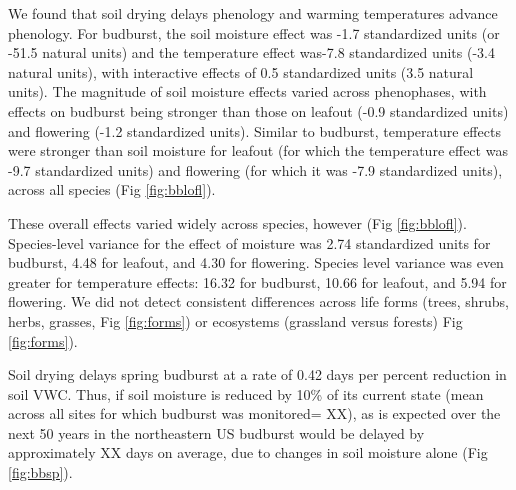 \documentclass{article}
\begin{document}
\par We found that soil drying delays phenology and warming temperatures advance phenology. For budburst, the soil moisture effect was -1.7 standardized units (or -51.5 natural units) and the temperature effect was-7.8 standardized units (-3.4 natural units), with interactive effects of 0.5 standardized units (3.5 natural units). The magnitude of soil moisture effects varied across phenophases, with effects on budburst being stronger than those on leafout (-0.9 standardized units) and flowering (-1.2 standardized units). Similar to budburst, temperature effects were stronger than soil moisture for leafout (for which the temperature effect was -9.7 standardized units) and flowering (for which it was -7.9 standardized units), across all species (Fig \ref{fig:bblofl}). %
\par These overall effects varied widely across species, however (Fig \ref{fig:bblofl}). Species-level variance for the effect of moisture was 2.74 standardized units for budburst, 4.48 for leafout, and 4.30 for flowering. Species level variance was even greater for temperature effects: 16.32 for budburst, 10.66 for leafout, and 5.94 for flowering.
We did not detect consistent differences across life forms (trees, shrubs, herbs, grasses, Fig \ref{fig:forms}) or ecosystems (grassland versus forests) Fig \ref{fig:forms}).

\par Soil drying delays spring budburst at a rate of 0.42 days per percent reduction in soil VWC. Thus, if soil moisture is reduced by 10\% of its current state (mean across all sites for which budburst was monitored= XX), as is expected over the next 50 years in the northeastern US \citep{berg2017} budburst would be delayed by approximately XX days on average, due to changes in soil moisture alone (Fig \ref{fig:bbsp}).



\end{document}
